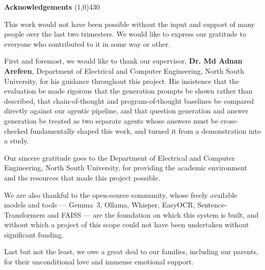 \begin{center}
{\huge \bf Acknowledgements}
\line(1,0){430}
\end{center}



This work would not have been possible without the input and support of many people
over the last two trimesters. We would like to express our gratitude to everyone who
contributed to it in some way or other.

First and foremost, we would like to thank our supervisor, \textbf{Dr. Md Adnan Arefeen},
Department of Electrical and Computer Engineering, North South University, for his
guidance throughout this project. His insistence that the evaluation be made rigorous
that the generation prompts be shown rather than described, that chain-of-thought
and program-of-thought baselines be compared directly against our agentic pipeline,
and that question generation and answer generation be treated as two separate agents
whose answers must be cross-checked fundamentally shaped this work, and turned it
from a demonstration into a study.

Our sincere gratitude goes to the Department of Electrical and Computer Engineering,
North South University, for providing the academic environment and the resources that
made this project possible.

We are also thankful to the open-source community, whose freely available models and
tools --- Gemma~3, Ollama, Whisper, EasyOCR, Sentence-Transformers and FAISS --- are
the foundation on which this system is built, and without which a project of this
scope could not have been undertaken without significant funding.

Last but not the least, we owe a great deal to our families, including our parents,
for their unconditional love and immense emotional support.
